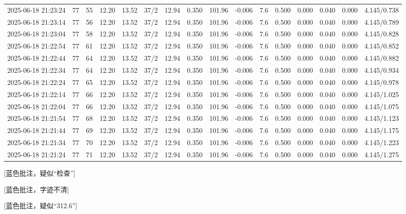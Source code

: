 \documentclass[UTF8,10pt,a4paper,fontset=fandol]{ctexart}
\newcommand{\handwritten}[1]{#1}
\begin{document}
\begin{center}
{\begin{tabular}{|l|r|r|r|r|r|r|r|r|r|r|r|c|r|r|r|}
2025-06-18 21:23:24 & 77&55&12.20&13.52&37/2&12.94&0.350&101.96&-0.006&7.6&0.500&0.000&0.040&0.000&4.145/0.738\\
2025-06-18 21:23:14 & 77&56&12.20&13.52&37/2&12.94&0.350&101.96&-0.006&7.6&0.500&0.000&0.040&0.000&4.145/0.789\\
2025-06-18 21:23:04 & 77&58&12.20&13.52&37/2&12.94&0.350&101.96&-0.006&7.6&0.500&0.000&0.040&0.000&4.145/0.828\\
2025-06-18 21:22:54 & 77&61&12.20&13.52&37/2&12.94&0.350&101.96&-0.006&7.6&0.500&0.000&0.040&0.000&4.145/0.852\\
2025-06-18 21:22:44 & 77&64&12.20&13.52&37/2&12.94&0.350&101.96&-0.006&7.6&0.500&0.000&0.040&0.000&4.145/0.882\\
2025-06-18 21:22:34 & 77&64&12.20&13.52&37/2&12.94&0.350&101.96&-0.006&7.6&0.500&0.000&0.040&0.000&4.145/0.934\\
2025-06-18 21:22:24 & 77&65&12.20&13.52&37/2&12.94&0.350&101.96&-0.006&7.6&0.500&0.000&0.040&0.000&4.145/0.978\\
2025-06-18 21:22:14 & 77&66&12.20&13.52&37/2&12.94&0.350&101.96&-0.006&7.6&0.500&0.000&0.040&0.000&4.145/1.025\\
2025-06-18 21:22:04 & 77&66&12.20&13.52&37/2&12.94&0.350&101.96&-0.006&7.6&0.500&0.000&0.040&0.000&4.145/1.075\\
2025-06-18 21:21:54 & 77&68&12.20&13.52&37/2&12.94&0.350&101.96&-0.006&7.6&0.500&0.000&0.040&0.000&4.145/1.123\\
2025-06-18 21:21:44 & 77&69&12.20&13.52&37/2&12.94&0.350&101.96&-0.006&7.6&0.500&0.000&0.040&0.000&4.145/1.175\\
2025-06-18 21:21:34 & 77&70&12.20&13.52&37/2&12.94&0.350&101.96&-0.006&7.6&0.500&0.000&0.040&0.000&4.145/1.223\\
2025-06-18 21:21:24 & 77&71&12.20&13.52&37/2&12.94&0.350&101.96&-0.006&7.6&0.500&0.000&0.040&0.000&4.145/1.275\\
\hline
\end{tabular}%
}
\end{center}

\handwritten{[蓝色批注，疑似“检查”]}

\handwritten{[蓝色批注，字迹不清]}

\handwritten{[蓝色批注，疑似“312.6”]}
\end{document}
